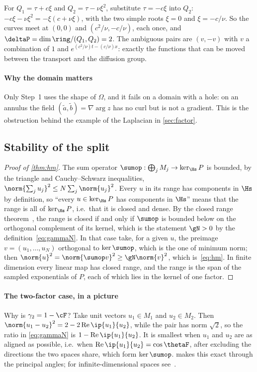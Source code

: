 \begin{example}\label{sm:ex:delta}
For $Q_1=\tau+c\xi$ and $Q_2=\tau-\nu\xi^2$, substitute $\tau=-c\xi$ into $Q_2$: $-c\xi-\nu\xi^2=-\xi(c+\nu\xi)$, with the two
simple roots $\xi=0$ and $\xi=-c/\nu$. So the curves meet at $(0,0)$ and $(c^2/\nu,-c/\nu)$, each once, and
$\deltaP=\dim\ring/(Q_1,Q_2)=2$. The ambiguous pairs are $(v,-v)$ with $v$ a combination of $1$ and
$e^{(c^2/\nu)t-(c/\nu)x}$: exactly the functions that can be moved between the transport and the diffusion group.
\end{example}

\paragraph{Why the domain matters} Only Step~1 uses the shape of $\Omega$, and it fails on a domain with a hole: on an
annulus the field $(\tilde a,\tilde b)=\nabla\arg z$ has no curl but is not a gradient. This is the obstruction behind the
example of the Laplacian in \cref{sec:factor}.

\subsection{Stability of the split}\label{sm:proof-hm}
\begin{proof}[Proof of \cref{thm:hm}]
The sum operator $\sumop:\bigoplus_jM_j\to\ker_{\Hs}P$ is bounded, by the triangle and Cauchy--Schwarz inequalities,
$\norm{\sum_ju_j}^2\le N\sum_j\norm{u_j}^2$. Every $u$ in its range has components in $\Hs$ by definition, so ``every
$u\in\ker_{\Hs}P$ has components in $\Hs$'' means that the range is all of $\ker_{\Hs}P$, i.e.\ that it is closed and
dense. By the closed range theorem~\cite[Thm.~2.21]{Bre11}, the range is closed if and only if $\sumop$ is bounded below on
the orthogonal complement of its kernel, which is the statement $\gN>0$ by the definition~\eqref{eq:gammaN}. In that
case take, for a given $u$, the preimage $v=(u_1,\dots,u_N)$ orthogonal to $\ker\sumop$, which is the one of minimum norm;
then $\norm{u}^2=\norm{\sumop v}^2\ge\gN\norm{v}^2$, which is~\eqref{eq:hm}. In finite dimension every linear map has
closed range, and the range is the span of the sampled exponentials of $P$, each of which lies in the kernel of one
factor.
\end{proof}

\paragraph{The two-factor case, in a picture} Why is $\gamma_2=1-\cF$? Take unit vectors $u_1\in M_1$ and $u_2\in M_2$.
Then $\norm{u_1-u_2}^2=2-2\operatorname{Re}\ip{u_1}{u_2}$, while the pair has norm $\sqrt2$, so the ratio in
\eqref{eq:gammaN} is $1-\operatorname{Re}\ip{u_1}{u_2}$. It is smallest when $u_1$ and $u_2$ are as aligned as possible,
i.e.\ when $\operatorname{Re}\ip{u_1}{u_2}=\cos\thetaF$, after excluding the directions the two spaces share, which form
$\ker\sumop$.  makes this exact through the principal angles; for infinite-dimensional spaces
see~\cite[Ch.~9]{Deu01}.

